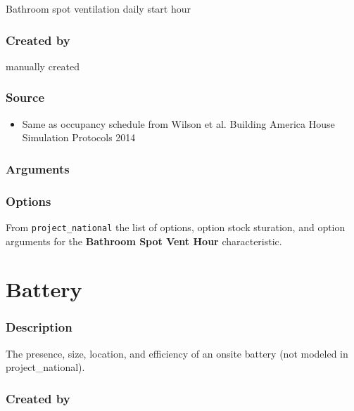 Bathroom spot ventilation daily start hour

\subsubsection{Created by}\label{created-by-5}

manually created

\subsubsection{Source}\label{source-5}

\begin{itemize}
 
\item
  Same as occupancy schedule from Wilson et al.
  \textquotesingle Building America House Simulation
  Protocols\textquotesingle{} 2014
\end{itemize}

\subsubsection{Arguments}\label{arguments-1}



\subsubsection{Options}\label{options-5}

From \texttt{project\_national} the list of options, option stock
sturation, and option arguments for the \textbf{Bathroom Spot Vent Hour}
characteristic.



\section{Battery}\label{battery}

\subsubsection{Description}\label{description-6}

The presence, size, location, and efficiency of an onsite battery (not
modeled in project\_national).

\subsubsection{Created by}\label{created-by-6}

